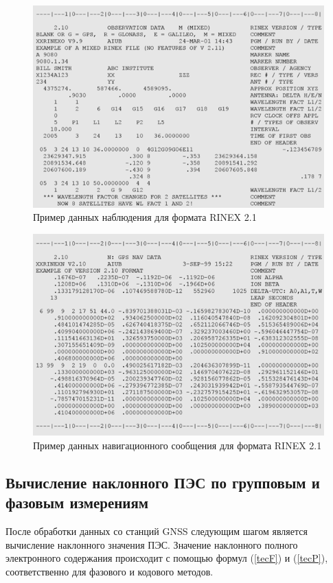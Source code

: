 \documentclass[a4paper]{article}
\begin{document}
\begin{figure}[h!]
\centering
\includegraphics[width = 1\linewidth]{pics/rinex_obs.png}
\caption{Пример данных наблюдения для формата RINEX 2.1}
\end{figure}

\begin{figure}[h!]
\centering
\includegraphics[width = 1\linewidth]{pics/rinex_nav.png}
\caption{Пример данных навигационного сообщения для формата RINEX 2.1}
\end{figure}


\newpage

\subsection{Вычисление наклонного ПЭС по групповым и фазовым измерениям}
После обработки данных со станций GNSS следующим шагом является вычисление наклонного значения ПЭС. Значение наклонного полного электронного содержания происходит с помощью формул (\ref{tecF}) и (\ref{tecP}), соответственно для фазового и кодового методов. 
\end{document}
